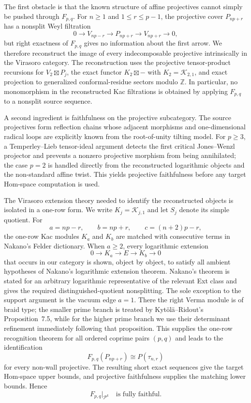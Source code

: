 \documentclass[12pt,leqno]{amsart}
\numberwithin{equation}{section}
\newcommand{\Kac}{\mathcal K}
\def\Z{\mathbb{Z}}
\begin{document}
The first obstacle is that the known structure of affine projectives cannot
simply be pushed through $F_{p,q}$.  For $n\geq1$ and
$1\leq r\leq p-1$, the projective cover $P_{np+r}$ has a nonsplit Weyl
filtration
\[
 0\longrightarrow V_{np-r}\longrightarrow P_{np+r}
 \longrightarrow V_{np+r}\longrightarrow0,
\]
but right exactness of $F_{p,q}$ gives no information about the first
arrow.  We therefore reconstruct the image of every indecomposable
projective intrinsically in the Virasoro category.  The reconstruction uses
the projective tensor-product recursions for $V_2\boxtimes P_j$, the exact
functor $K_2\boxtimes-$ with $K_2=\Kac_{2,1}$, and exact projection to
generalized conformal-residue sectors modulo $\Z$.  In particular, no
monomorphism in the reconstructed Kac filtrations is obtained by applying
$F_{p,q}$ to a nonsplit source sequence.

A second ingredient is faithfulness on the projective subcategory.  The
source projectives form reflection chains whose adjacent morphisms and
one-dimensional radical loops are explicitly known from the
root-of-unity tilting model.  For $p\geq3$, a Temperley--Lieb tensor-ideal
argument detects the first critical Jones--Wenzl projector and prevents a
nonzero projective morphism from being annihilated; the case $p=2$ is
handled directly from the reconstructed logarithmic objects and the
non-standard affine twist.  This yields projective faithfulness before any
target Hom-space computation is used.

The Virasoro extension theory needed to identify the reconstructed objects
is isolated in a one-row form.  We write $K_j=\Kac_{j,1}$ and let $S_j$
denote its simple quotient.  For
\[
 a=np-r,\qquad b=np+r,\qquad c=(n+2)p-r,
\]
the one-row Kac modules $K_a$ and $K_b$ are matched with consecutive terms
in Nakano's Felder dictionary.  When $a\geq2$, every logarithmic extension
\[
 0\longrightarrow K_a\longrightarrow E\longrightarrow K_b
 \longrightarrow0
\]
that occurs in our category is shown, object by object, to satisfy all
ambient hypotheses of Nakano's logarithmic extension theorem.  Nakano's
theorem is stated for an arbitrary logarithmic representative of the
relevant Ext class and gives the required distinguished-quotient
nonsplitting.  The sole exception to the support argument is the vacuum
edge $a=1$.  There the right Verma module is of braid type; the smaller
prime branch is treated by Kyt\"ol\"a--Ridout's Proposition~7.5, while
for the higher prime branch we use their determinant refinement immediately
following that proposition.  This supplies the one-row recognition theorem
for all ordered coprime pairs $(p,q)$ and leads to the identification
\[
 F_{p,q}(P_{np+r})\cong P(\tau_{n,r})
\]
for every non-wall projective.  The resulting short exact sequences give
the target Hom-space upper bounds, and projective faithfulness supplies the
matching lower bounds.  Hence
\[
 F_{p,q}\big|_{\mathcal P^k}
 \quad\text{is fully faithful}.
\]
\end{document}
